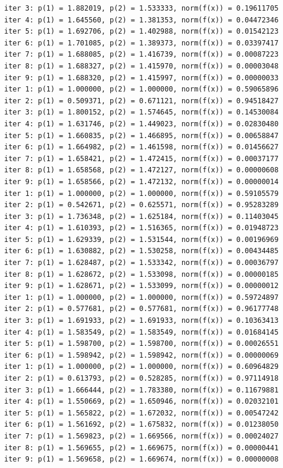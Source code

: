 \documentclass[12pt]{article}
\begin{document}
\begin{tiny}
\begin{verbatim}
iter 3: p(1) = 1.882019, p(2) = 1.533333, norm(f(x)) = 0.19611705
iter 4: p(1) = 1.645560, p(2) = 1.381353, norm(f(x)) = 0.04472346
iter 5: p(1) = 1.692706, p(2) = 1.402988, norm(f(x)) = 0.01542123
iter 6: p(1) = 1.701085, p(2) = 1.389373, norm(f(x)) = 0.03397417
iter 7: p(1) = 1.688085, p(2) = 1.416739, norm(f(x)) = 0.00087223
iter 8: p(1) = 1.688327, p(2) = 1.415970, norm(f(x)) = 0.00003048
iter 9: p(1) = 1.688320, p(2) = 1.415997, norm(f(x)) = 0.00000033
iter 1: p(1) = 1.000000, p(2) = 1.000000, norm(f(x)) = 0.59065896
iter 2: p(1) = 0.509371, p(2) = 0.671121, norm(f(x)) = 0.94518427
iter 3: p(1) = 1.800152, p(2) = 1.574645, norm(f(x)) = 0.14530084
iter 4: p(1) = 1.631746, p(2) = 1.449023, norm(f(x)) = 0.02830480
iter 5: p(1) = 1.660835, p(2) = 1.466895, norm(f(x)) = 0.00658847
iter 6: p(1) = 1.664982, p(2) = 1.461598, norm(f(x)) = 0.01456627
iter 7: p(1) = 1.658421, p(2) = 1.472415, norm(f(x)) = 0.00037177
iter 8: p(1) = 1.658568, p(2) = 1.472127, norm(f(x)) = 0.00000608
iter 9: p(1) = 1.658566, p(2) = 1.472132, norm(f(x)) = 0.00000014
iter 1: p(1) = 1.000000, p(2) = 1.000000, norm(f(x)) = 0.59105579
iter 2: p(1) = 0.542671, p(2) = 0.625571, norm(f(x)) = 0.95283289
iter 3: p(1) = 1.736348, p(2) = 1.625184, norm(f(x)) = 0.11403045
iter 4: p(1) = 1.610393, p(2) = 1.516365, norm(f(x)) = 0.01948723
iter 5: p(1) = 1.629339, p(2) = 1.531544, norm(f(x)) = 0.00196969
iter 6: p(1) = 1.630882, p(2) = 1.530258, norm(f(x)) = 0.00434485
iter 7: p(1) = 1.628487, p(2) = 1.533342, norm(f(x)) = 0.00036797
iter 8: p(1) = 1.628672, p(2) = 1.533098, norm(f(x)) = 0.00000185
iter 9: p(1) = 1.628671, p(2) = 1.533099, norm(f(x)) = 0.00000012
iter 1: p(1) = 1.000000, p(2) = 1.000000, norm(f(x)) = 0.59724897
iter 2: p(1) = 0.577681, p(2) = 0.577681, norm(f(x)) = 0.96177748
iter 3: p(1) = 1.691933, p(2) = 1.691933, norm(f(x)) = 0.10363413
iter 4: p(1) = 1.583549, p(2) = 1.583549, norm(f(x)) = 0.01684145
iter 5: p(1) = 1.598700, p(2) = 1.598700, norm(f(x)) = 0.00026551
iter 6: p(1) = 1.598942, p(2) = 1.598942, norm(f(x)) = 0.00000069
iter 1: p(1) = 1.000000, p(2) = 1.000000, norm(f(x)) = 0.60964829
iter 2: p(1) = 0.613793, p(2) = 0.528285, norm(f(x)) = 0.97114918
iter 3: p(1) = 1.666444, p(2) = 1.783380, norm(f(x)) = 0.11679881
iter 4: p(1) = 1.550669, p(2) = 1.650946, norm(f(x)) = 0.02032101
iter 5: p(1) = 1.565822, p(2) = 1.672032, norm(f(x)) = 0.00547242
iter 6: p(1) = 1.561692, p(2) = 1.675832, norm(f(x)) = 0.01238050
iter 7: p(1) = 1.569823, p(2) = 1.669566, norm(f(x)) = 0.00024027
iter 8: p(1) = 1.569655, p(2) = 1.669675, norm(f(x)) = 0.00000441
iter 9: p(1) = 1.569658, p(2) = 1.669674, norm(f(x)) = 0.00000008

\end{verbatim}
\end{tiny}
\end{document}
